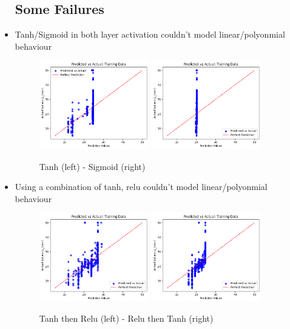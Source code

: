 \documentclass[12pt,a4paper]{article}
\begin{document}
\begin{itemize}
\subsection{Some Failures}
\item Tanh/Sigmoid in both layer activation couldn't model linear/polyonmial behaviour
\begin{figure}[h!]
    \centering
    \includegraphics[width=0.45\textwidth]{3_tanh} 
    \includegraphics[width=0.45\textwidth]{3_sigmoid} 
    \caption{Tanh (left) - Sigmoid (right)}
    \label{fig:example}
\end{figure}
\item Using a combination of tanh, relu couldn't model linear/polyonmial behaviour
\begin{figure}[h!]
    \centering
    \includegraphics[width=0.45\textwidth]{3_tanh_relu} 
    \includegraphics[width=0.45\textwidth]{3_relu_tanh} 
    \caption{Tanh then Relu (left) - Relu then Tanh (right)}
    \label{fig:example}
\end{figure}
\end{itemize}
\pagebreak
\end{document}
